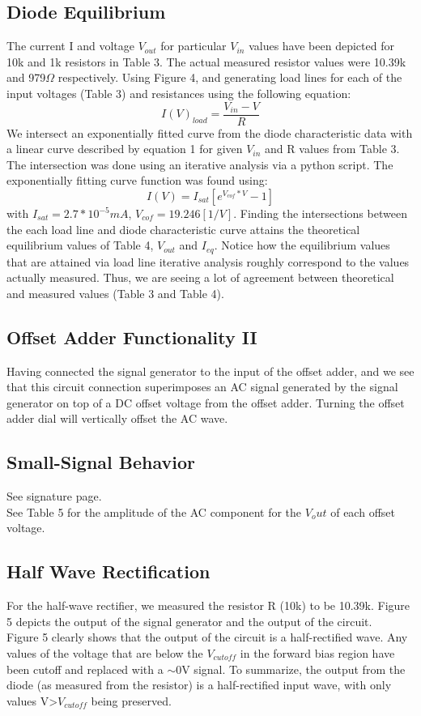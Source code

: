 \documentclass{article}
\begin{document}
\subsection{Diode Equilibrium}
    The current I and voltage $V_{out}$ for particular $V_{in}$ values have been depicted for 10k and 1k resistors in Table 3. The actual measured resistor values were 10.39k and 979$\Omega$ respectively. Using Figure 4, and generating load lines for each of the input voltages (Table 3) and resistances using the following equation:
    \begin{equation}
        I(V)_{load} = \frac{V_{in}-V}{R}
    \end{equation}
    We intersect an exponentially fitted curve from the diode characteristic data with a linear curve described by equation 1 for given $V_{in}$ and R values from Table 3. The intersection was done using an iterative analysis via a python script. The exponentially fitting curve function was found using:
    \begin{equation}
        I(V) = I_{sat}[e^{V_{cof}*V} - 1]
    \end{equation}
    with $I_{sat} = 2.7*10^{-5} mA$, $V_{cof} = 19.246 [1/V]$. Finding the intersections between the each load line and diode characteristic curve attains the theoretical equilibrium values of Table 4, $V_{out}$ and $I_{eq}$. Notice how the equilibrium values that are attained via load line iterative analysis roughly correspond to the values actually measured. Thus, we are seeing a lot of agreement between theoretical and measured values (Table 3 and Table 4).
\subsection{Offset Adder Functionality II}
    Having connected the signal generator to the input of the offset adder, and we see that this circuit connection superimposes an AC signal generated by the signal generator on top of a DC offset voltage from the offset adder. Turning the offset adder dial will vertically offset the AC wave.
\subsection{Small-Signal Behavior}
    See signature page.\\
    See Table 5 for the amplitude of the AC component for the $V_out$ of each offset voltage.
    
\subsection{Half Wave Rectification}
    For the half-wave rectifier, we measured the resistor R (10k) to be 10.39k. Figure 5 depicts the output of the signal generator and the output of the circuit. \\ Figure 5 clearly shows that the output of the circuit is a half-rectified wave. Any values of the voltage that are below the $V_{cutoff}$ in the forward bias region have been cutoff and replaced with a $\sim$0V signal. To summarize, the output from the diode (as measured from the resistor) is a half-rectified input wave, with only values V>$V_{cutoff}$ being preserved.
\end{document}
